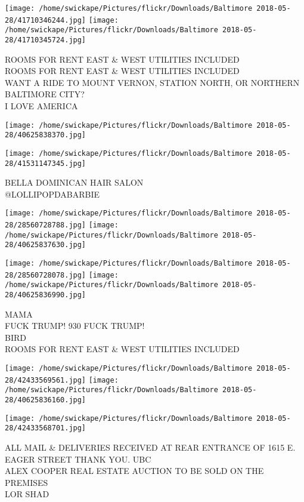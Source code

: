 \documentclass[10pt,letterpaper]{article}
\begin{document}
\texttt{[image: /home/swickape/Pictures/flickr/Downloads/Baltimore 2018-05-28/41710346244.jpg]}
\texttt{[image: /home/swickape/Pictures/flickr/Downloads/Baltimore 2018-05-28/41710345724.jpg]}

ROOMS FOR RENT EAST \& WEST UTILITIES INCLUDED\\
ROOMS FOR RENT EAST \& WEST UTILITIES INCLUDED\\
WANT A RIDE TO MOUNT VERNON, STATION NORTH, OR NORTHERN BALTIMORE CITY?\\
I LOVE AMERICA
\pagebreak

\texttt{[image: /home/swickape/Pictures/flickr/Downloads/Baltimore 2018-05-28/40625838370.jpg]}

\vspace{0.25in}
\texttt{[image: /home/swickape/Pictures/flickr/Downloads/Baltimore 2018-05-28/41531147345.jpg]}

BELLA DOMINICAN HAIR SALON\\
@LOLLIPOPDABARBIE
\pagebreak

\texttt{[image: /home/swickape/Pictures/flickr/Downloads/Baltimore 2018-05-28/28560728788.jpg]}
\texttt{[image: /home/swickape/Pictures/flickr/Downloads/Baltimore 2018-05-28/40625837630.jpg]}

\texttt{[image: /home/swickape/Pictures/flickr/Downloads/Baltimore 2018-05-28/28560728078.jpg]}
\texttt{[image: /home/swickape/Pictures/flickr/Downloads/Baltimore 2018-05-28/40625836990.jpg]}

MAMA\\
FUCK TRUMP!  930 FUCK TRUMP!\\
BIRD\\
ROOMS FOR RENT EAST \& WEST UTILITIES INCLUDED
\pagebreak

\texttt{[image: /home/swickape/Pictures/flickr/Downloads/Baltimore 2018-05-28/42433569561.jpg]}
\texttt{[image: /home/swickape/Pictures/flickr/Downloads/Baltimore 2018-05-28/40625836160.jpg]}

\vspace{0.25in}
\texttt{[image: /home/swickape/Pictures/flickr/Downloads/Baltimore 2018-05-28/42433568701.jpg]}

ALL MAIL \& DELIVERIES RECEIVED AT REAR ENTRANCE OF 1615 E. EAGER STREET THANK YOU. UBC\\
ALEX COOPER REAL ESTATE AUCTION TO BE SOLD ON THE PREMISES\\
LOR SHAD
\pagebreak
\end{document}
